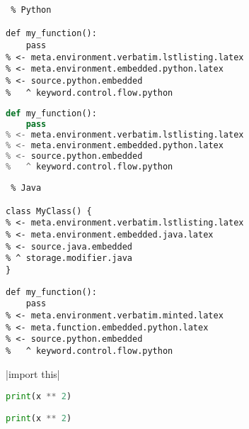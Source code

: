 \documentclass[12pt]{article}
\begin{document}

\begin{lstlisting} % Python

def my_function():
    pass
% <- meta.environment.verbatim.lstlisting.latex
% <- meta.environment.embedded.python.latex
% <- source.python.embedded
%   ^ keyword.control.flow.python
\end{lstlisting}

\begin{lstlisting}[frame=single,
                   language=python]
def my_function():
    pass
% <- meta.environment.verbatim.lstlisting.latex
% <- meta.environment.embedded.python.latex
% <- source.python.embedded
%   ^ keyword.control.flow.python
\end{lstlisting}

\begin{lstlisting} % Java

class MyClass() {
% <- meta.environment.verbatim.lstlisting.latex
% <- meta.environment.embedded.java.latex
% <- source.java.embedded
% ^ storage.modifier.java
}
\end{lstlisting}



\begin{verbatim}
def my_function():
    pass
% <- meta.environment.verbatim.minted.latex
% <- meta.function.embedded.python.latex
% <- source.python.embedded
%   ^ keyword.control.flow.python
\end{verbatim}



|import this|


\mintinline {python}{print(x ** 2)}

\mintinline {python}+print(x ** 2)+
\end{document}
